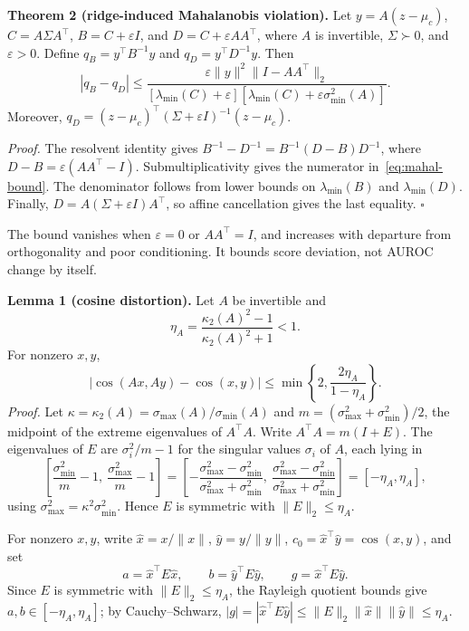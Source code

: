 \documentclass[pdflatex,sn-basic]{sn-jnl}
\theoremstyle{plain}
\theoremstyle{definition}
\theoremstyle{remark}
\begin{document}
\textbf{Theorem 2 (ridge-induced Mahalanobis violation).} Let $y=A(z-\mu_c)$, $C=A\Sigma A^\top$, $B=C+\varepsilon I$, and $D=C+\varepsilon AA^\top$, where $A$ is invertible, $\Sigma\succ0$, and $\varepsilon>0$. Define $q_B=y^\top B^{-1}y$ and $q_D=y^\top D^{-1}y$. Then
\begin{equation}
|q_B-q_D|\le
\frac{\varepsilon\|y\|^2\|I-AA^\top\|_2}
{[\lambda_{\min}(C)+\varepsilon]
 [\lambda_{\min}(C)+\varepsilon\sigma_{\min}^2(A)]}.
\label{eq:mahal-bound}
\end{equation}
Moreover, $q_D=(z-\mu_c)^\top(\Sigma+\varepsilon I)^{-1}(z-\mu_c)$.

\emph{Proof.} The resolvent identity gives $B^{-1}-D^{-1}=B^{-1}(D-B)D^{-1}$, where $D-B=\varepsilon(AA^\top-I)$. Submultiplicativity gives the numerator in~\eqref{eq:mahal-bound}. The denominator follows from lower bounds on $\lambda_{\min}(B)$ and $\lambda_{\min}(D)$. Finally, $D=A(\Sigma+\varepsilon I)A^\top$, so affine cancellation gives the last equality. \hfill$\square$

The bound vanishes when $\varepsilon=0$ or $AA^\top=I$, and increases with departure from orthogonality and poor conditioning. It bounds score deviation, not AUROC change by itself.

\textbf{Lemma 1 (cosine distortion).} Let $A$ be invertible and
\begin{equation}
\eta_A=\frac{\kappa_2(A)^2-1}{\kappa_2(A)^2+1}<1.
\end{equation}
For nonzero $x,y$,
\begin{equation}
|\cos(Ax,Ay)-\cos(x,y)|
\le \min\!\left\{2,\frac{2\eta_A}{1-\eta_A}\right\}.
\label{eq:cos-bound}
\end{equation}
\emph{Proof.} Let $\kappa=\kappa_2(A)=\sigma_{\max}(A)/\sigma_{\min}(A)$ and
$m=(\sigma_{\max}^2+\sigma_{\min}^2)/2$, the midpoint of the extreme
eigenvalues of $A^\top A$. Write $A^\top A = m(I+E)$. The eigenvalues of $E$
are $\sigma_i^2/m-1$ for the singular values $\sigma_i$ of $A$, each lying in
\[
\left[\frac{\sigma_{\min}^2}{m}-1,\ \frac{\sigma_{\max}^2}{m}-1\right]
=\left[-\frac{\sigma_{\max}^2-\sigma_{\min}^2}{\sigma_{\max}^2+\sigma_{\min}^2},\
\frac{\sigma_{\max}^2-\sigma_{\min}^2}{\sigma_{\max}^2+\sigma_{\min}^2}\right]
=[-\eta_A,\eta_A],
\]
using $\sigma_{\max}^2=\kappa^2\sigma_{\min}^2$. Hence $E$ is symmetric with
$\|E\|_2\le\eta_A$.

For nonzero $x,y$, write $\hat x=x/\|x\|$, $\hat y=y/\|y\|$,
$c_0=\hat x^\top\hat y=\cos(x,y)$, and set
\begin{equation}
a=\hat x^\top E\hat x,\qquad b=\hat y^\top E\hat y,\qquad g=\hat x^\top E\hat y.
\end{equation}
Since $E$ is symmetric with $\|E\|_2\le\eta_A$, the Rayleigh quotient bounds
give $a,b\in[-\eta_A,\eta_A]$; by Cauchy--Schwarz,
$|g|=|\hat x^\top E\hat y|\le\|E\|_2\|\hat x\|\|\hat y\|\le\eta_A$.
\end{document}
